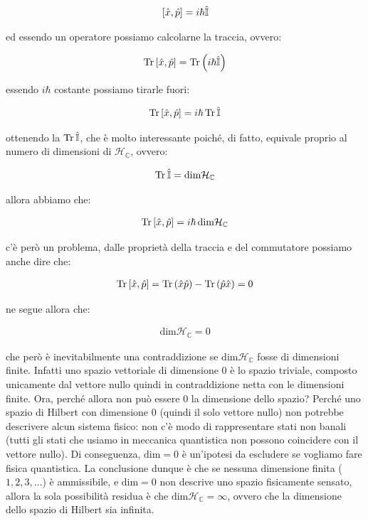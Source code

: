 \begin{align*}
	\qty[\hat{x}, \hat{p}] = i \hbar \hat{\mathbb{I}} 
\end{align*}

	ed essendo un operatore possiamo calcolarne la traccia, ovvero:
	
\begin{align*}
	\Tr\qty[\hat{x}, \hat{p}]  = \Tr\qty( i \hbar \hat{\mathbb{I}} )
\end{align*}

	essendo $i\hbar$ costante possiamo tirarle fuori:

\begin{align*}
	\Tr\qty[\hat{x}, \hat{p}]  = i \hbar \Tr\hat{\mathbb{I}} 
\end{align*}

	ottenendo la $\Tr\hat{\mathbb{I}}$, che è molto interessante poiché, di fatto, equivale proprio al numero di dimensioni di $\mathcal{H}_{\mathbb{C}}$, ovvero:
	
\begin{align*}
	\Tr\hat{\mathbb{I}} = \text{dim}\mathcal{H}_{\mathbb{C}}
\end{align*}
	
	allora abbiamo che:
	
\begin{align*}
	\Tr\qty[\hat{x}, \hat{p}] =  i \hbar \, \text{dim}\mathcal{H}_{\mathbb{C}}
\end{align*}

	c'è però un problema, dalle proprietà della traccia e del commutatore possiamo anche dire che:
	
\begin{align*}
	\Tr\qty[\hat{x}, \hat{p}] = \Tr\qty(\hat{x}\hat{p}) - \Tr\qty(\hat{p}\hat{x}) = 0
\end{align*}

	ne segue allora che:
	
\begin{align*}
 	\text{dim}\mathcal{H}_{\mathbb{C}} = 0
\end{align*}

	che però è inevitabilmente una contraddizione se $\text{dim}\mathcal{H}_{\mathbb{C}}$ fosse di dimensioni finite. Infatti uno spazio vettoriale di dimensione $0$ è lo spazio triviale, composto unicamente dal vettore nullo quindi in contraddizione netta con le dimensioni finite. Ora, perché allora non può essere $0$ la dimensione dello spazio? Perché uno spazio di Hilbert con dimensione $0$ (quindi il solo vettore nullo) non potrebbe descrivere alcun sistema fisico: non c’è modo di rappresentare stati non banali (tutti gli stati che usiamo in meccanica quantistica non possono coincidere con il vettore nullo). Di conseguenza, $\text{dim}= 0$ è un’ipotesi da escludere se vogliamo fare fisica quantistica. La conclusione dunque è che se nessuna dimensione finita ($1, 2, 3, \ldots$) è ammissibile, e $\text{dim} = 0$ non descrive uno spazio fisicamente sensato, allora la sola possibilità residua è che $\text{dim}\mathcal{H}_{\mathbb{C}} = \infty$, ovvero che la dimensione dello spazio di Hilbert sia infinita.
	
